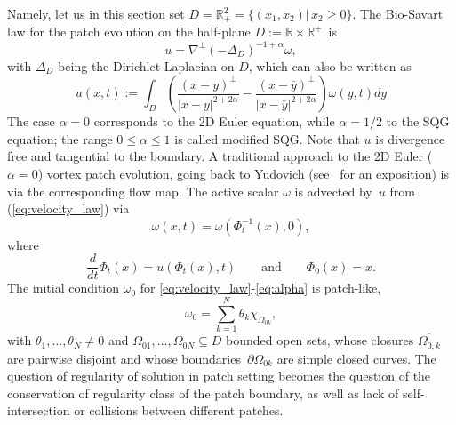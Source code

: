 \documentclass[reqno,centertags, 11pt]{amsart}
\def \Rm {\mathbb R}
\begin{document}
Namely, let us in this section set $D=\Rm^2_+=\{(x_1,x_2) \left| \,x_2 \geq 0 \right. \}.$
The Bio-Savart law for the patch evolution on the half-plane $D := \Rm\times\Rm^+$~is
\[
u=\nabla^\perp (-\Delta_D)^{-1+\alpha}\omega,
\]
with $\Delta_D$ being the Dirichlet Laplacian on $D$, which can also be written as
\begin{equation}
u(x, t) :=  \int_D \left( \frac{(x-y)^\perp}{|x-y|^{2+2\alpha}} -
\frac{(x-\bar y)^\perp}{|x-\bar y|^{2+2\alpha}} \right) \omega(y,t) dy
\label{eq:velocity_law}
\end{equation}
The case $\alpha = 0$ corresponds to the 2D Euler equation, while $\alpha=1/2$ to the SQG equation; the range $0 \leq \alpha \leq 1$
is called modified SQG. Note that $u$ is divergence free and tangential to the boundary.
A traditional approach to the 2D Euler ($\alpha=0$) vortex patch evolution, going back to Yudovich (see~\cite{MP}
for an exposition) is via the corresponding  flow map. The active scalar $\omega$ is advected by~$u$ from (\ref{eq:velocity_law}) via
\begin{equation}\label{1.31}
\omega(x,t) = \omega \left(\Phi^{-1}_t(x),0\right),
\end{equation}
where
\begin{equation}\label{eq:alpha}
\frac{d}{dt}\Phi_t(x) = u\left(\Phi_t(x),t \right) \qquad\text{and}\qquad  \Phi_0(x)=x.
\end{equation}
The initial condition $\omega_0$ for  \eqref{eq:velocity_law}-\eqref{eq:alpha} is patch-like,
\begin{equation}\label{patchlikeid}
\omega_0 = \sum_{k=1}^N \theta_k \chi_{\Omega_{0k}},
\end{equation}
with $\theta_1,\dots,\theta_N\neq 0$ and $\Omega_{01},\dots,\Omega_{0N}\subseteq D$  bounded open sets, whose closures $\overline{\Omega_{0,k}}$ are
pairwise disjoint and whose boundaries~$\partial\Omega_{0k}$
are simple closed curves. The question of regularity of solution in patch setting becomes the question of the conservation of regularity class
of the patch boundary, as well as lack of self-intersection or collisions between different patches.
\end{document}
